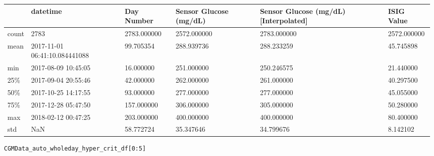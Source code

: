 \bigskip\noindent
\begin{tabular}{p{}p{}p{}p{}p{}p{}}
\toprule
 & datetime & Day Number & Sensor Glucose (mg/dL) & Sensor Glucose (mg/dL) [Interpolated] & ISIG Value \\
\hline
count & 2783 & 2783.000000 & 2572.000000 & 2783.000000 & 2572.000000 \\
\hline
mean & 2017-11-01 06:41:10.084441088 & 99.705354 & 288.939736 & 288.233259 & 45.745898 \\
\hline
min & 2017-08-09 10:45:05 & 16.000000 & 251.000000 & 250.246575 & 21.440000 \\
\hline
25\% & 2017-09-04 20:55:46 & 42.000000 & 262.000000 & 261.000000 & 40.297500 \\
\hline
50\% & 2017-10-25 14:17:55 & 93.000000 & 277.000000 & 277.000000 & 45.055000 \\
\hline
75\% & 2017-12-28 05:47:50 & 157.000000 & 306.000000 & 305.000000 & 50.280000 \\
\hline
max & 2018-02-12 00:47:25 & 203.000000 & 400.000000 & 400.000000 & 80.400000 \\
\hline
std & NaN & 58.772724 & 35.347646 & 34.799676 & 8.142102 \\
\hline
\bottomrule
\end{tabular}

\bigskip

\begin{verbatim}
CGMData_auto_wholeday_hyper_crit_df[0:5]
\end{verbatim}


